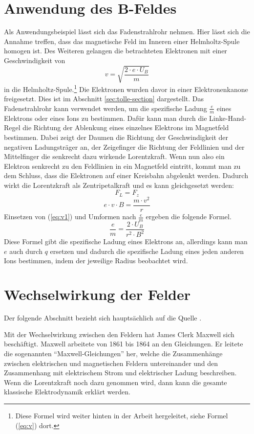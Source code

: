 \section{Anwendung des B-Feldes}
\label{sec:Fadenstrahlrohr}
Als Anwendungsbeispiel lässt sich das Fadenstrahlrohr nehmen.
Hier lässt sich die Annahme treffen, dass das magnetische Feld im Inneren einer Helmholtz-Spule homogen ist. Des Weiteren gelangen die betrachteten Elektronen mit einer Geschwindigkeit von 
\begin{equation}
\label{eq:v1}
    v=\sqrt{\frac{2 \cdot e \cdot U_B}{m}}
\end{equation}
in die Helmholtz-Spule.\footnote{Diese Formel wird weiter hinten in der Arbeit hergeleitet, siehe Formel (\ref{eq:v}) dort.}
Die Elektronen wurden davor in einer Elektronenkanone freigesetzt.
Dies ist im Abschnitt \ref{sec:tolle-section} dargestellt. 
Das Fadenstrahlrohr kann verwendet werden, um die spezifische Ladung $\frac{e}{m}$ eines Elektrons oder eines Ions zu bestimmen.
Dafür kann man durch die Linke-Hand-Regel die Richtung der Ablenkung eines einzelnes Elektrons im Magnetfeld bestimmen.
Dabei zeigt der Daumen die Richtung der Geschwindigkeit der negativen Ladungsträger an, der Zeigefinger die Richtung der Feldlinien und der Mittelfinger die senkrecht dazu wirkende Lorentzkraft.
Wenn nun also ein Elektron senkrecht zu den Feldlinien in ein Magnetfeld eintritt, kommt man zu dem Schluss, dass die Elektronen auf einer Kreisbahn abgelenkt werden. 
Dadurch wirkt die Lorentzkraft als Zentripetalkraft und es kann gleichgesetzt werden:
$$F_L = F_z$$
$$e \cdot v \cdot B = \frac{m \cdot v^2}{r}$$
Einsetzen von (\ref{eq:v1}) und  Umformen nach $\frac{e}{m}$ ergeben die folgende Formel.
\begin{equation*}
    \frac{e}{m} = \frac{2 \cdot U_B}{ r^2 \cdot B^2}
\end{equation*}
Diese Formel gibt die spezifische Ladung eines Elektrons an, allerdings kann man $e$ auch durch $q$ ersetzen und dadurch die spezifische Ladung eines jeden anderen Ions bestimmen, indem der jeweilige Radius beobachtet wird.
\section{Wechselwirkung der Felder}%
\label{sec:Maxwell}
Der folgende Abschnitt bezieht sich hauptsächlich auf die Quelle \cite{Maxwell}.

Mit der Wechselwirkung zwischen den Feldern hat James Clerk Maxwell sich
beschäftigt.
Maxwell arbeitete von 1861 bis 1864 an den Gleichungen.
Er leitete die sogenannten "`Maxwell-Gleichungen"' her, welche die Zusammenhänge zwischen elektrischen und magnetischen Feldern untereinander und den Zusammenhang mit elektrischem Strom und elektrischer Ladung beschreiben.
Wenn die Lorentzkraft noch dazu genommen wird, dann kann die gesamte klassische Elektrodynamik erklärt werden.

